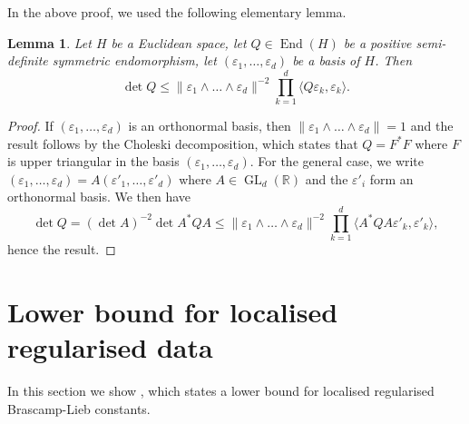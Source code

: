 \documentclass[a4paper,english]{amsart}
\newtheorem{lemma}[thm]{Lemma}
\theoremstyle{definition}
\newcommand{\R}{\mathbb{R}}
\newcommand{\eps}{\varepsilon}
\newcommand{\1}{\mathbbm{1}}
\DeclareMathOperator{\End}{End}
\DeclareMathOperator{\GL}{GL}
\begin{document}
In the above proof, we used the following elementary lemma.
\begin{lemma}\label{eq:Choleski}
Let $H$ be a Euclidean space, let $Q\in \End(H)$ be a positive semi-definite symmetric endomorphism,  let  $(\eps_{1}, \dots, \eps_{d})$ be a basis of $H$.
Then
\begin{equation*}
\det Q \leq \|\eps_{1}\wedge \dots \wedge \eps_{d}\|^{-2}\prod_{k=1}^d \langle Q \eps_{k}, \eps_{k}\rangle.
\end{equation*}
\end{lemma}

\begin{proof}
If  $(\eps_{1}, \dots, \eps_{d})$ is an orthonormal basis, then $\|\eps_{1}\wedge \dots \wedge \eps_{d}\|=1$ and the result follows by  the Choleski decomposition, which states  that $Q=F^*F$ where $F$ is upper triangular in the basis $(\eps_{1}, \dots, \eps_{d})$. For the general case, we  write $(\eps_{1}, \dots, \eps_{d})=A(\eps'_{1}, \dots, \eps'_{d})$ where $A\in \GL_{d}(\R)$ and the $\eps'_{i}$ form an orthonormal basis. We then have
$$\det Q = (\det A)^{-2}\det A^*Q A \leq \|\eps_{1}\wedge \dots \wedge \eps_{d}\|^{-2} \prod_{k=1}^d \langle A^*Q A \eps'_{k}, \eps'_{k}\rangle,$$
hence the result.
\end{proof}






\section{Lower bound for localised regularised  data}

In this section we show , which states a lower bound for localised regularised   Brascamp-Lieb constants.
\end{document}
